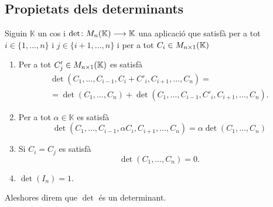 \documentclass[../../Main.tex]{subfiles}
\begin{document}
	\subsection{Propietats dels determinants}
	\begin{definition}[Determinant]
		\label{def:determinant d'una matriu}
		Siguin \(\mathbb{K}\) un cos i \(\det\colon M_{n}(\mathbb{K})\longrightarrow\mathbb{K}\) una aplicació que satisfà per a tot \(i\in\{1,\dots,n\}\) i \(j\in\{i+1,\dots,n\}\) i per a tot \(C_{i}\in M_{n\times1}(\mathbb{K})\)
		\begin{enumerate}
			\item Per a tot \(C'_{j}\in M_{n\times1}(\mathbb{K})\) es satisfà
			\begin{multline*}
			\det(C_{1},\dots,C_{i-1},C_{i}+C'_{i},C_{i+1},\dots,C_{n})=\\
			=\det(C_{1},\dots,C_{n})+\det(C_{1},\dots,C_{i-1},C'_{i},C_{i+1},\dots,C_{n}).
			\end{multline*}
			\item Per a tot \(\alpha\in\mathbb{K}\) es satisfà 
			\[
			    \det(C_{1},\dots,C_{i-1},\alpha C_{i},C_{i+1},\dots,C_{n})=\alpha\det(C_{1},\dots,C_{n})
			\]
			\item Si \(C_{i}=C_{j}\) es satisfà
			\[
			    \det(C_{1},\dots,C_{n})=0.
			\]
			\item \(\det(I_{n})=1\).
		\end{enumerate}
		Aleshores direm que \(\det\) és un determinant.
	\end{definition}
	\begin{proposition}
		
	\end{proposition}
%	
%	
\end{document}
